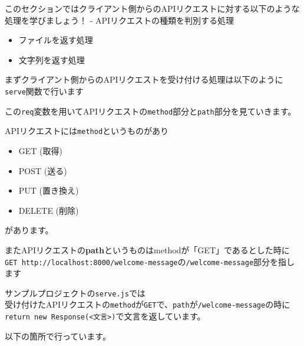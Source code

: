 このセクションではクライアント側からのAPIリクエストに対する以下のような処理を学びましょう！
- APIリクエストの種類を判別する処理

\begin{itemize}
\item
  ファイルを返す処理
\item
  文字列を返す処理
\end{itemize}

まずクライアント側からのAPIリクエストを受け付ける処理は以下のように\texttt{serve}関数で行います

\begin{Shaded}
\begin{Highlighting}[]
\CommentTok{/**}
\CommentTok{ */}
\KeywordTok{=\textgreater{}}\NormalTok{ \{}
\NormalTok{\})}\OperatorTok{;}
\end{Highlighting}
\end{Shaded}

この\texttt{req}変数を用いてAPIリクエストの\texttt{method}部分と\texttt{path}部分を見ていきます。

APIリクエストには\texttt{method}というものがあり

\begin{itemize}
\item
  GET (取得)
\item
  POST (送る)
\item
  PUT (置き換え)
\item
  DELETE (削除)
\end{itemize}

があります。

またAPIリクエストの\textbf{path}というものはmethodが「GET」であるとした時に\\
\texttt{GET\ http://localhost:8000/welcome-message}の\texttt{/welcome-message}部分を指します

サンプルプロジェクトの\texttt{serve.js}では\\
受け付けたAPIリクエストの\texttt{method}が\texttt{GET}で、\texttt{path}が\texttt{/welcome-message}の時に\texttt{return\ new\ Response(\textless{}文言\textgreater{})}で文言を返しています。

以下の箇所で行っています。

